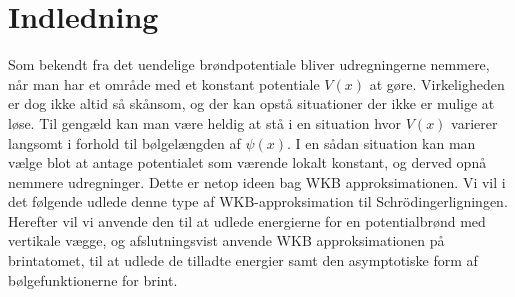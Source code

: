 \section{Indledning}


Som bekendt fra det uendelige brøndpotentiale bliver udregningerne nemmere, når man har et område med et konstant potentiale $V(x)$ at gøre. Virkeligheden er dog ikke altid så skånsom, og der kan opstå situationer der ikke er mulige at løse. Til gengæld kan man være heldig at stå i en situation hvor $V(x)$ varierer langsomt i forhold til bølgelængden af $\psi(x)$. I en sådan situation kan man vælge blot at antage potentialet som værende lokalt konstant, og derved opnå nemmere udregninger. Dette er netop ideen bag WKB approksimationen.
Vi vil i det følgende udlede denne type af WKB-approksimation til Schrödingerligningen. Herefter vil vi anvende den til at udlede energierne for en potentialbrønd med vertikale vægge, og afslutningsvist anvende WKB approksimationen på brintatomet, til at udlede de tilladte energier samt den asymptotiske form af bølgefunktionerne for brint.
